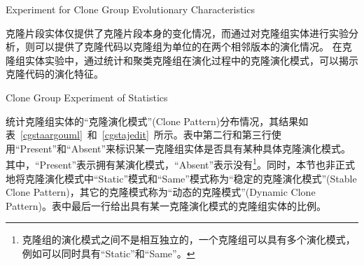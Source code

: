 
{Experiment for Clone Group Evolutionary Characteristics}

克隆片段实体仅提供了克隆片段本身的变化情况，而通过对克隆组实体进行实验分析，则可以提供了克隆代码以克隆组为单位的在两个相邻版本的演化情况。 在克隆组实体实验中，通过统计和聚类克隆组在演化过程中的克隆演化模式，可以揭示克隆代码的演化特征。

{Clone Group Experiment of Statistics} 

统计克隆组实体的“克隆演化模式”(Clone Pattern)分布情况，其结果如表~\ref{cgstaargouml}~和~\ref{cgstajedit}~所示。表中第二行和第三行使用“Present”和“Absent”来标识某一克隆组实体是否具有某种具体克隆演化模式。其中，“Present”表示拥有某演化模式，“Absent”表示没有\footnote{克隆组的演化模式之间不是相互独立的，一个克隆组可以具有多个演化模式，例如可以同时具有“Static”和“Same”。}。同时，本节也非正式地将克隆演化模式中“Static”模式和“Same”模式称为“稳定的克隆演化模式”(Stable Clone Pattern)，其它的克隆模式称为“动态的克隆模式”(Dynamic Clone Pattern)。表中最后一行给出具有某一克隆演化模式的克隆组实体的比例。

